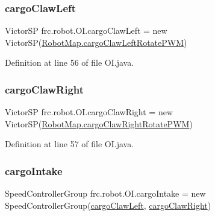 \subsubsection{\texorpdfstring{cargo\+Claw\+Left}{cargoClawLeft}}
{\footnotesize\ttfamily Victor\+SP frc.\+robot.\+O\+I.\+cargo\+Claw\+Left = new Victor\+SP(\hyperlink{classfrc_1_1robot_1_1RobotMap_aa5824f279bf68bbd68ae1ea3087c4b67}{Robot\+Map.\+cargo\+Claw\+Left\+Rotate\+P\+WM})\hspace{0.3cm}{\ttfamily [static]}}



Definition at line 56 of file O\+I.\+java.

\mbox{\label{classfrc_1_1robot_1_1OI_a32fd81c9a712924aa42a9eb74f278df1}} 
\subsubsection{\texorpdfstring{cargo\+Claw\+Right}{cargoClawRight}}
{\footnotesize\ttfamily Victor\+SP frc.\+robot.\+O\+I.\+cargo\+Claw\+Right = new Victor\+SP(\hyperlink{classfrc_1_1robot_1_1RobotMap_a108c3b97c541e7ed5a152cea66981231}{Robot\+Map.\+cargo\+Claw\+Right\+Rotate\+P\+WM})\hspace{0.3cm}{\ttfamily [static]}}



Definition at line 57 of file O\+I.\+java.

\mbox{\label{classfrc_1_1robot_1_1OI_a40d2adcc988805032885ba668fc6f86f}} 
\subsubsection{\texorpdfstring{cargo\+Intake}{cargoIntake}}
{\footnotesize\ttfamily Speed\+Controller\+Group frc.\+robot.\+O\+I.\+cargo\+Intake = new Speed\+Controller\+Group(\hyperlink{classfrc_1_1robot_1_1OI_a7ec725773fd1bb5dc4263980a232e75f}{cargo\+Claw\+Left}, \hyperlink{classfrc_1_1robot_1_1OI_a32fd81c9a712924aa42a9eb74f278df1}{cargo\+Claw\+Right})\hspace{0.3cm}{\ttfamily [static]}}




